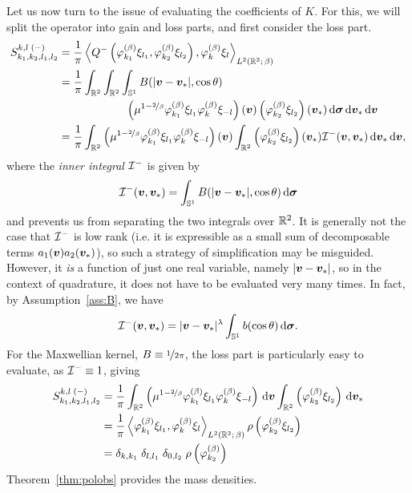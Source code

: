 Let us now turn to the issue of evaluating the coefficients of $K$. For this, we will split the operator into
gain and loss parts, and first consider the loss part.
\begin{align*}
    S_{k_1,k_2,l_1,l_2}^{k,l\;(-)}
    &= \frac{1}{\pi} \left\langle Q^-\left(\varphi^{(\beta)}_{k_1} \xi_{l_1},
    \varphi^{(\beta)}_{k_2} \xi_{l_2}\right), \varphi^{(\beta)}_k \xi_l \right\rangle_{L^2(\mathbb{R}^2;\,\beta)} \\
    &= \frac{1}{\pi} \int_{\mathbb{R}^2}\int_{\mathbb{R}^2}\int_{\mathbb{S}^1}B(|{\bm v}-{\bm v}_\ast|,\cos\theta) \\
    & \qquad\qquad\qquad
    \left(\mu^{1-\nicefrac{2}{\beta}}\varphi^{(\beta)}_{k_1}\xi_{l_1} \varphi^{(\beta)}_{k}\xi_{-l}\right)({\bm v})
    \left(\varphi^{(\beta)}_{k_2}\xi_{l_2}\right)({\bm v}_\ast)
    \,\mathrm{d}{\bm\sigma}\,\mathrm{d}{\bm v}_\ast\,\mathrm{d}{\bm v} \\
    &= \frac{1}{\pi}
    \int_{\mathbb{R}^2} \left(\mu^{1-\nicefrac{2}{\beta}}
            \varphi^{(\beta)}_{k_1}\xi_{l_1} \varphi^{(\beta)}_{k}\xi_{-l}\right)({\bm v})
    \int_{\mathbb{R}^2} \left(\varphi^{(\beta)}_{k_2}\xi_{l_2}\right)({\bm v}_\ast) \mathcal{I}^-({\bm v},{\bm v}_\ast) \,\mathrm{d}{\bm v}_\ast \,\mathrm{d}{\bm v},
\end{align*}
where the {\em inner integral} $\mathcal{I}^-$ is given by
\[
    \mathcal{I}^-({\bm v},{\bm v}_\ast) = \int_{\mathbb{S}^1} B(|{\bm v}-{\bm v}_\ast|, \cos\theta) \,\mathrm{d}{\bm\sigma}
\]
and prevents us from separating the two integrals over $\mathbb{R}^2$. It is generally not the case that $\mathcal{I}^-$ is
low rank (i.e. it is expressible as a small sum of decomposable terms $a_1({\bm v})a_2({\bm v}_\ast)$), so such a
strategy of simplification may be misguided. However, it {\em is} a function of just one real variable, namely
$|{\bm v}-{\bm v}_\ast|$, so in the context of quadrature, it does not have to be evaluated very many times. In
fact, by Assumption~\ref{ass:B}, we have
\[
    \mathcal{I}^-({\bm v},{\bm v}_\ast) = |{\bm v}-{\bm v}_\ast|^\lambda \int_{\mathbb{S}^1} b(\cos\theta) \,\mathrm{d}{\bm\sigma}.
\]
For the Maxwellian kernel, $B\equiv\nicefrac{1}{2\pi}$, the loss part is particularly easy to evaluate, as
$\mathcal{I}^-\equiv1$, giving
\begin{align*}
    S_{k_1,k_2,l_1,l_2}^{k,l\;(-)}
    &= \frac{1}{\pi} \int_{\mathbb{R}^2} \left( \mu^{1-\nicefrac{2}{\beta}}
       \varphi^{(\beta)}_{k_1}\xi_{l_1} \varphi^{(\beta)}_{k}\xi_{-l}\right)\,\mathrm{d}{\bm v}
       \int_{\mathbb{R}^2} \left(\varphi^{(\beta)}_{k_2}\xi_{l_2}\right)\,\mathrm{d}{\bm v}_\ast \\
    &= \frac{1}{\pi} \left\langle\varphi^{(\beta)}_{k_1}\xi_{l_1},
                                 \varphi^{(\beta)}_{k}\xi_{l}\right\rangle_{L^2(\mathbb{R}^2;\,\beta)}
       \rho\left(\varphi^{(\beta)}_{k_2}\xi_{l_2}\right) \\
       &= \delta_{k,k_1}\;\delta_{l,l_1}\;\delta_{0,l_2}\;\rho\left(\varphi^{(\beta)}_{k_2}\right)
\end{align*}
Theorem~\ref{thm:polobs} provides the mass densities.

